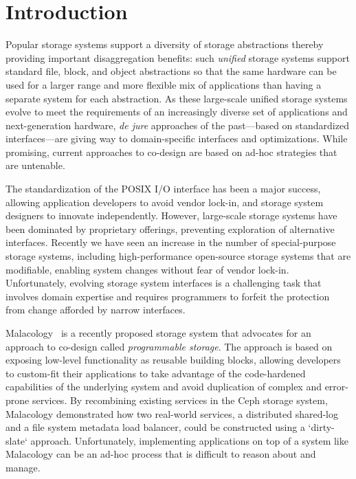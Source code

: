 \section{Introduction}
\label{sec:intro}

Popular storage systems support a diversity of storage abstractions thereby
providing important disaggregation benefits: such \emph{unified} storage
systems support standard file, block, and object abstractions so that the same
hardware can be used for a larger range and more flexible mix of applications
than having a separate  system for each abstraction.  As these large-scale
unified storage systems evolve to meet the requirements of an increasingly
diverse set of applications and next-generation hardware, \emph{de jure}
approaches of the past---based on standardized interfaces---are giving way to
domain-specific interfaces and optimizations. While promising, current
approaches to co-design are based on ad-hoc strategies that are untenable.

The standardization of the POSIX I/O interface has been a major success,
allowing application developers to avoid vendor lock-in, and storage system
designers to innovate independently.
However, large-scale storage systems have been
dominated by proprietary offerings, preventing exploration of alternative
interfaces. Recently we have seen an increase
in the number of special-purpose storage systems, including high-performance
open-source storage systems that are modifiable, enabling system changes
without fear of vendor lock-in. Unfortunately, evolving storage system
interfaces is a challenging task that involves domain expertise and requires
programmers to forfeit the protection from change afforded by narrow
interfaces.

Malacology~\cite{sevilla:eurosys17} is a recently proposed storage system that
advocates for an approach to co-design called \emph{programmable storage}. The
approach is based on exposing low-level functionality as reusable building
blocks, allowing developers to custom-fit their applications to take advantage
of the code-hardened capabilities of the underlying system and avoid
duplication of complex and error-prone services. By recombining existing
services in the Ceph storage system, Malacology demonstrated how two
real-world services, a distributed shared-log and a file system metadata load
balancer, could be constructed using a `dirty-slate` approach. Unfortunately, implementing
applications on top of a system like Malacology can be an ad-hoc process
that is difficult to reason about and manage.

